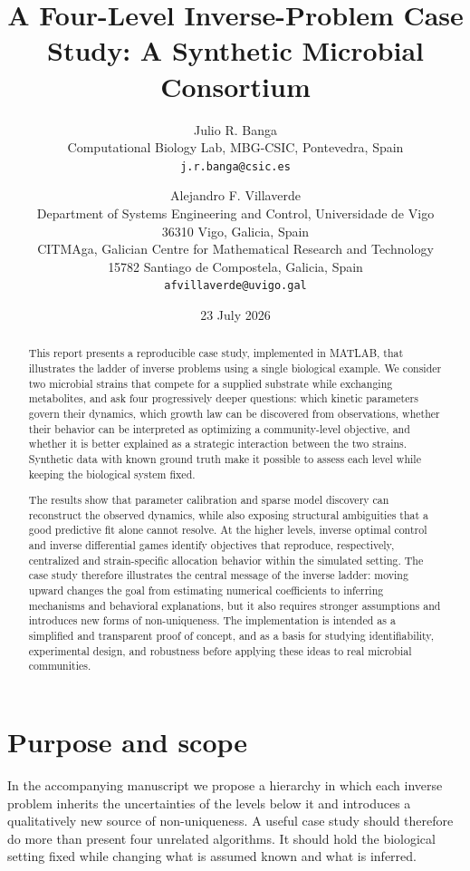 \documentclass[11pt,a4paper]{article}
\title{\textbf{A Four-Level Inverse-Problem Case Study: A Synthetic Microbial Consortium}}
\author{
Julio R. Banga\\
Computational Biology Lab, MBG-CSIC, Pontevedra, Spain\\
\texttt{j.r.banga@csic.es}
\and
Alejandro F. Villaverde\\
Department of Systems Engineering and Control, Universidade de Vigo\\
36310 Vigo, Galicia, Spain\\
CITMAga, Galician Centre for Mathematical Research and Technology\\
15782 Santiago de Compostela, Galicia, Spain\\
\texttt{afvillaverde@uvigo.gal}
}
\date{23 July 2026}
\begin{document}
\maketitle

\begin{abstract}
This report presents a reproducible case study, implemented in MATLAB, that illustrates the ladder of inverse problems using a single biological example. We consider two microbial strains that
compete for a supplied substrate while exchanging metabolites, and ask four
progressively deeper questions: which kinetic parameters govern their dynamics,
which growth law can be discovered from observations, whether their behavior
can be interpreted as optimizing a community-level objective, and whether it
is better explained as a strategic interaction between the two strains.
Synthetic data with known ground truth make it possible to assess each level
while keeping the biological system fixed.

The results show that parameter calibration and sparse model discovery can
reconstruct the observed dynamics, while also exposing structural ambiguities
that a good predictive fit alone cannot resolve. At the higher levels, inverse
optimal control and inverse differential games identify objectives that
reproduce, respectively, centralized and strain-specific allocation behavior
within the simulated setting. The case study therefore illustrates the central
message of the inverse ladder: moving upward changes the goal from estimating
numerical coefficients to inferring mechanisms and behavioral explanations,
but it also requires stronger assumptions and introduces new forms of
non-uniqueness. The implementation is intended as a simplified and transparent proof of
concept, and as a basis for studying identifiability, experimental design, and
robustness before applying these ideas to real microbial communities.
\end{abstract}

\tableofcontents
\clearpage

\section{Purpose and scope}

In the accompanying manuscript \cite{BangaVillaverde2026} we propose a hierarchy in
which each inverse problem inherits the uncertainties of the levels below it
and introduces a qualitatively new source of non-uniqueness. A useful case
study should therefore do more than present four unrelated algorithms. It
should hold the biological setting fixed while changing what is assumed known
and what is inferred.
\end{document}
